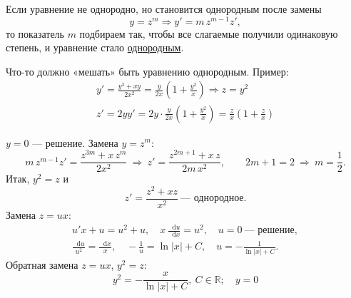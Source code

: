 \documentclass[12pt,a4paper]{article}
\numberwithin{equation}{section}
\newcommand{\R}{\mathbb{R}}
\newcommand{\dd}{\mathop{}\!\mathrm{d}}
\begin{document}
\label{box:type5}
\begin{definitionHSE}
Если уравнение не однородно, но становится однородным после замены
\[
y=z^m\Longrightarrow y'=m\,z^{m-1}z',
\]
то показатель $m$ подбираем так, чтобы все слагаемые получили одинаковую степень, и уравнение стало \hyperref[box:type3]{однородным}.
\end{definitionHSE}
\begin{remarkHSE}
Что-то должно «мешать» быть уравнению однородным. Пример:
\begin{gather*}
y'=\frac{y^3+xy}{2x^2}=\frac{y}{2x}\left(1+\frac{y^2}{x}\right)\Longrightarrow z=y^2\\
z'=2yy'=2y\cdot\frac{y}{2x}\left(1+\frac{y^2}{x}\right)=\frac{z}{x}\left(1+\frac{z}{x}\right)
\end{gather*}
\end{remarkHSE}
\begin{exampleHSE}[\(y'=\dfrac{y^3+xy}{2x^2}\)]
$y=0$ --- решение. Замена $y=z^m$:
\[
m\,z^{m-1}z'=\frac{z^{3m}+x\,z^m}{2x^2}\ \Longrightarrow\
z'=\frac{z^{2m+1}+x\,z}{2m\,x^2},\qquad 2m+1=2\ \Longrightarrow\ m=\frac12.
\]
Итак, $y^2=z$ и
\[
z'=\frac{z^2+xz}{x^2}\ \text{--- однородное.}
\]
Замена $z=ux$:
\begin{gather*}
u'x+u=u^2+u,\quad x\,\frac{\dd u}{\dd x}=u^2,\quad u=0\ \text{--- решение},\\
\frac{\dd u}{u^2}=\frac{\dd x}{x},\quad -\frac1u=\ln|x|+C,\quad u=-\frac{1}{\ln|x|+C}.
\end{gather*}
Обратная замена $z=ux$, $y^2=z$:
\[
\boxed{\ y^2=-\frac{x}{\ln|x|+C},\ C\in\R;\quad y=0\ }
\]
\end{exampleHSE}
\end{document}
